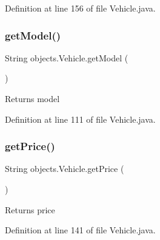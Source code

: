 Definition at line 156 of file Vehicle.\+java.


\begin{DoxyCode}{0}

\end{DoxyCode}
\mbox{\label{classobjects_1_1_vehicle_a1956a7b0b92454fa540af1ce0e2a0e41}} 
\subsubsection{\texorpdfstring{getModel()}{getModel()}}
{\footnotesize\ttfamily String objects.\+Vehicle.\+get\+Model (\begin{DoxyParamCaption}{ }\end{DoxyParamCaption})}

\begin{DoxyReturn}{Returns}
model 
\end{DoxyReturn}


Definition at line 111 of file Vehicle.\+java.


\begin{DoxyCode}{0}

\end{DoxyCode}
\mbox{\label{classobjects_1_1_vehicle_af95e90045655c94d7deb20c4f4a39e3b}} 
\subsubsection{\texorpdfstring{getPrice()}{getPrice()}}
{\footnotesize\ttfamily String objects.\+Vehicle.\+get\+Price (\begin{DoxyParamCaption}{ }\end{DoxyParamCaption})}

\begin{DoxyReturn}{Returns}
price 
\end{DoxyReturn}


Definition at line 141 of file Vehicle.\+java.


